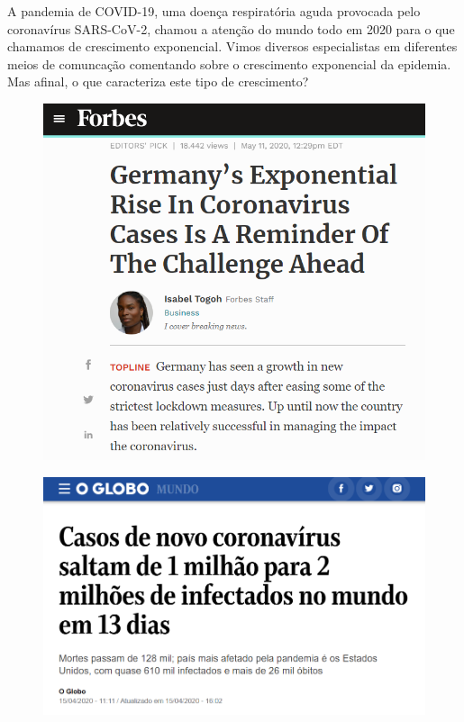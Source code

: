 \mainmatter


A pandemia de COVID-19, uma doença respiratória aguda provocada pelo coronavírus SARS-CoV-2, chamou a atenção do mundo todo em 2020 para o que chamamos de crescimento exponencial. Vimos diversos especialistas em diferentes meios de comuncação comentando sobre o crescimento exponencial da epidemia. Mas afinal, o que caracteriza este tipo de crescimento?









\begin{minipage}{0.4\textwidth}
\begin{figure}[H]
\centering

\includegraphics[width=150bp]{Figuras/exponencial1.png}
\end{figure}
\end{minipage}
\begin{minipage}{0.6\textwidth}
\begin{figure}[H]
\centering

\includegraphics[width=230bp]{Figuras/exponencial2.png}
\end{figure}

\end{minipage}


